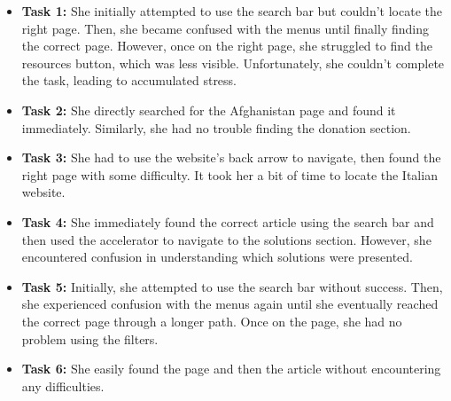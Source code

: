 \begin{itemize}
    \item \textbf{Task 1:} She initially attempted to use the search bar but couldn't locate the right page. Then, she became confused with the menus until finally finding the correct page. However, once on the right page, she struggled to find the resources button, which was less visible. Unfortunately, she couldn't complete the task, leading to accumulated stress.
    \item \textbf{Task 2:} She directly searched for the Afghanistan page and found it immediately. Similarly, she had no trouble finding the donation section.
    \item \textbf{Task 3:} She had to use the website's back arrow to navigate, then found the right page with some difficulty. It took her a bit of time to locate the Italian website.
    \item \textbf{Task 4:} She immediately found the correct article using the search bar and then used the accelerator to navigate to the solutions section. However, she encountered confusion in understanding which solutions were presented.
    \item \textbf{Task 5:} Initially, she attempted to use the search bar without success. Then, she experienced confusion with the menus again until she eventually reached the correct page through a longer path. Once on the page, she had no problem using the filters.
    \item \textbf{Task 6:} She easily found the page and then the article without encountering any difficulties.
\end{itemize}







\vspace{1cm}

